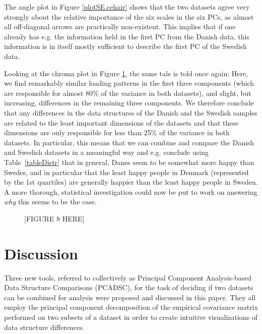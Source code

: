 \documentclass[a4paper,14pt]{article}
\begin{document}
The angle plot in Figure \ref{plotSE.cehair} shows that the two datasets agree very strongly about the relative importance of the six scales in the six PCs, as almost all off-diagonal arrows are practically non-existent. This implies that if one already has e.g. the information held in the first PC from the Danish data, this information is in itself mostly sufficient to describe the first PC of the Swedish data.

Looking at the chroma plot in Figure \ref{plotSE.pancake}, the same tale is told once again: Here, we find remarkably similar loading patterns in the first three components (which are responsible for almost 80\% of the variance in both datasets), and slight, but increasing, differences in the remaining three components. We therefore conclude that any differences in the data structures of the Danish and the Swedish samples are related to the least important dimensions of the datasets and that these dimensions are only responsible for less than 25\% of the variance in both datasets. In particular, this means that we can combine and compare the Danish and Swedish datasets in a meaningful way and e.g. conclude using Table~\ref{tableDistr} that in general, Danes seem to be somewhat more happy than Swedes, and in particular that the least happy people in Denmark (represented by the 1st quartiles) are generally happier than the least happy people in Sweden. A more thorough, statistical investigation could now be put to work on answering \textit{why} this seems to be the case.

\begin{figure}[!h]
\caption{[FIGURE 8 HERE]}
\label{plotSE.pancake}
\end{figure}


\section*{Discussion}\label{sec.Discussion}


Three new tools, referred to collectively as Principal Component Analysis-based Data Structure Comparisons (PCADSC), for the task of deciding if two datasets can be combined for analysis were proposed and discussed in this paper. They all employ the principal component decomposition of the empirical covariance matrix performed on two subsets of a dataset in order to create intuitive visualizations of data structure differences.
\end{document}
